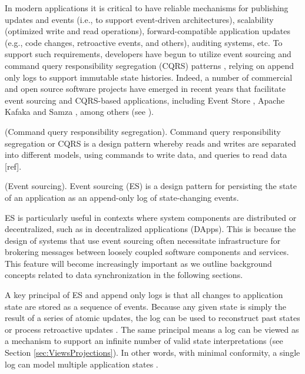 \documentclass{textile}
\begin{document}
In modern applications it is critical to have reliable mechanisms for publishing updates and events (i.e., to support event-driven architectures), scalability (optimized write and read operations), forward-compatible application updates (e.g., code changes, retroactive events, and others), auditing systems, etc. To support such requirements, developers have begun to utilize event sourcing and command query responsibility segregation (CQRS) patterns \cite{bettsExploringCQRSEvent2013}, relying on append only logs to support immutable state histories. Indeed, a number of commercial and open source software projects have emerged in recent years that facilitate event sourcing and CQRS-based applications, including Event Store \cite{EventStore}, Apache Kafaka \cite{ApacheKafka} and Samza \cite{Samza}, among others (see \cite{kleppmannDesigningDataintensiveApplications2017}). 

\begin{definition} (Command query responsibility segregation). Command query responsibility segregation or CQRS is a design pattern whereby reads and writes are separated into different models, using commands to write data, and queries to read data [ref]. \end{definition}

\begin{definition} (Event sourcing). Event sourcing (ES) is a design pattern for persisting the state of an application as an append-only log of state-changing events. \end{definition}

ES is particularly useful in contexts where system components are distributed or decentralized, such as in decentralized applications (DApps). This is because the design of systems that use event sourcing often necessitate infrastructure for brokering messages between loosely coupled software components and services. This feature will become increasingly important as we outline background concepts related to data synchronization in the following sections. 

A key principal of ES and append only logs is that all changes to application state are stored as a sequence of events. Because any given state is simply the result of a series of atomic updates, the log can be used to reconstruct past states or process retroactive updates \cite{fowlerEventSourcing}. The same principal means a log can be viewed as a mechanism to support an infinite number of valid state interpretations (see Section  \ref{sec:ViewsProjections}). In other words, with minimal conformity, a single log can model multiple application states \cite{microsoftcorporationAzureApplicationArchitecture}.
\end{document}
